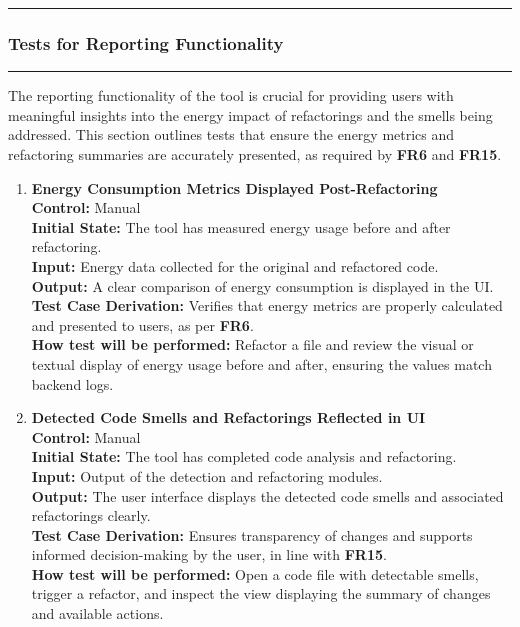 \documentclass[12pt, titlepage]{article}
\newcommand{\colorrule}{\textcolor{BlueViolet}{\rule{\linewidth}{2pt}}}
\begin{document}
\noindent\colorrule

\subsubsection{Tests for Reporting Functionality}
\colorrule

\medskip

\noindent
The reporting functionality of the tool is crucial for providing
users with meaningful insights into the energy impact of refactorings
and the smells being addressed. This section outlines tests that
ensure the energy metrics and refactoring summaries are accurately
presented, as required by \textbf{FR6} and \textbf{FR15}.

\begin{enumerate}[label={\bf
    \textcolor{Maroon}{test-FR-RP-\arabic*}}, wide=0pt, font=\itshape]

  \item \textbf{Energy Consumption Metrics Displayed Post-Refactoring} \\[2mm]
    \textbf{Control:} Manual \\
    \textbf{Initial State:} The tool has measured energy usage before and after refactoring. \\
    \textbf{Input:} Energy data collected for the original and refactored code. \\
    \textbf{Output:} A clear comparison of energy consumption is displayed in the UI. \\[2mm]
    \textbf{Test Case Derivation:} Verifies that energy metrics are properly calculated and presented to users, as per \textbf{FR6}. \\[2mm]
    \textbf{How test will be performed:} Refactor a file and review the visual or textual display of energy usage before and after, ensuring the values match backend logs.

  \item \textbf{Detected Code Smells and Refactorings Reflected in UI} \\[2mm]
    \textbf{Control:} Manual \\
    \textbf{Initial State:} The tool has completed code analysis and refactoring. \\
    \textbf{Input:} Output of the detection and refactoring modules. \\
    \textbf{Output:} The user interface displays the detected code smells and associated refactorings clearly. \\[2mm]
    \textbf{Test Case Derivation:} Ensures transparency of changes and supports informed decision-making by the user, in line with \textbf{FR15}. \\[2mm]
    \textbf{How test will be performed:} Open a code file with detectable smells, trigger a refactor, and inspect the view displaying the summary of changes and available actions.


\end{enumerate}
\end{document}
